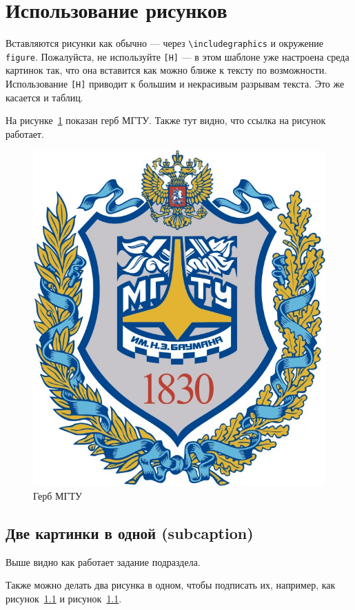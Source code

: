 \section{Использование рисунков}

Вставляются рисунки как обычно --- через \texttt{\textbackslash includegraphics} и окружение \texttt{figure}. Пожалуйста, не используйте \texttt{[H]} --- в этом шаблоне уже настроена среда картинок так, что она вставится как можно ближе к тексту по возможности. Использование \texttt{[H]} приводит к большим и некрасивым разрывам текста. Это же касается и таблиц.

На рисунке~\ref{fig:fig01} показан герб МГТУ. Также тут видно, что ссылка на рисунок работает.

\begin{figure}
  \centering
  \includegraphics[scale=0.7]{inc/bmstu}
  \caption{Герб МГТУ}
  \label{fig:fig01}
\end{figure}

\subsection{Две картинки в одной (subcaption)}

Выше видно как работает задание подраздела. 

Также можно делать два рисунка в одном, чтобы подписать их, например, как рисунок~\ref{} и рисунок~\ref{}.

